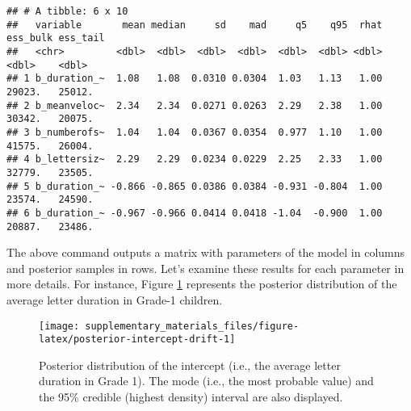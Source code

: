 \documentclass[
  11pt,
  english,
  ,doc,mask,floatsintext]{apa6}
\newenvironment{Shaded}{}{}
\newcommand{\AttributeTok}[1]{\textcolor[rgb]{0.49,0.56,0.16}{#1}}
\newcommand{\CommentTok}[1]{\textcolor[rgb]{0.38,0.63,0.69}{\textit{#1}}}
\newcommand{\ConstantTok}[1]{\textcolor[rgb]{0.53,0.00,0.00}{#1}}
\newcommand{\FunctionTok}[1]{\textcolor[rgb]{0.02,0.16,0.49}{#1}}
\newcommand{\NormalTok}[1]{#1}
\newcommand{\OtherTok}[1]{\textcolor[rgb]{0.00,0.44,0.13}{#1}}
\newcommand{\SpecialCharTok}[1]{\textcolor[rgb]{0.25,0.44,0.63}{#1}}
\newcommand{\StringTok}[1]{\textcolor[rgb]{0.25,0.44,0.63}{#1}}
\begin{document}
\begin{verbatim}
## # A tibble: 6 x 10
##   variable       mean median     sd    mad     q5    q95  rhat ess_bulk ess_tail
##   <chr>         <dbl>  <dbl>  <dbl>  <dbl>  <dbl>  <dbl> <dbl>    <dbl>    <dbl>
## 1 b_duration_~  1.08   1.08  0.0310 0.0304  1.03   1.13   1.00   29023.   25012.
## 2 b_meanveloc~  2.34   2.34  0.0271 0.0263  2.29   2.38   1.00   30342.   20075.
## 3 b_numberofs~  1.04   1.04  0.0367 0.0354  0.977  1.10   1.00   41575.   26004.
## 4 b_lettersiz~  2.29   2.29  0.0234 0.0229  2.25   2.33   1.00   32779.   23505.
## 5 b_duration_~ -0.866 -0.865 0.0386 0.0384 -0.931 -0.804  1.00   23574.   24590.
## 6 b_duration_~ -0.967 -0.966 0.0414 0.0418 -1.04  -0.900  1.00   20887.   23486.
\end{verbatim}

The above command outputs a matrix with parameters of the model in columns and posterior samples in rows. Let's examine these results for each parameter in more details. For instance, Figure \ref{fig:posterior-intercept-drift} represents the posterior distribution of the average letter duration in Grade-1 children.

\begin{Shaded}
\end{Shaded}

\begin{figure}[!htb]

{\centering \texttt{[image: supplementary\_materials\_files/figure-latex/posterior-intercept-drift-1]} 

}

\caption{Posterior distribution of the intercept (i.e., the average letter duration in Grade 1). The mode (i.e., the most probable value) and the 95\% credible (highest density) interval are also displayed.}\label{fig:posterior-intercept-drift}
\end{figure}
\end{document}
